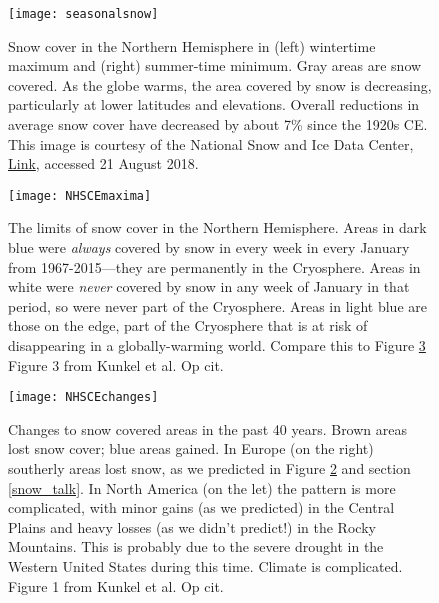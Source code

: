 \begin{figure}%
	\centering
  \texttt{[image: seasonalsnow]}%
	\caption{Snow cover in the Northern Hemisphere in (left) wintertime maximum and (right) summer-time minimum. Gray areas are snow covered. As the globe warms, the area covered by snow is decreasing, particularly at lower latitudes and elevations. Overall reductions in average snow cover have decreased by about 7\% since the 1920s CE. This image is courtesy of the National Snow and Ice Data Center,  \href{https://nsidc.org/cryosphere/snow/science/where.html}{Link}, accessed 21 August 2018.}
	\label{fig:seasonalsnow}
\end{figure}

\begin{figure}%
	\centering
  \texttt{[image: NHSCEmaxima]}%
	\caption{The limits of snow cover in the Northern Hemisphere. Areas in dark blue were \emph{always} covered by snow in every week in every January from 1967-2015---they are permanently in the Cryosphere. Areas in white were \emph{never} covered by snow in any week of January in that period, so were never part of the Cryosphere. Areas in light blue are those on the edge, part of the Cryosphere that is at risk of  disappearing in a globally-warming world. Compare this to Figure \ref{fig:sce} Figure 3 from Kunkel et al. Op cit.}
	\label{fig:scemax}
\end{figure}

\begin{figure}%
	\centering
  \texttt{[image: NHSCEchanges]}%
	\caption{Changes to snow covered areas in the past 40 years. Brown areas lost snow cover; blue areas gained. In Europe (on the right) southerly areas lost snow, as we predicted in Figure \ref{fig:scemax} and section \ref{snow_talk}. In North America (on the let) the pattern is more complicated, with minor gains (as we predicted) in the Central Plains and heavy losses (as we didn't predict!) in the Rocky Mountains. This is probably due to the severe drought in the Western United States during this time. Climate is complicated. Figure 1 from Kunkel et al. Op cit.}
	\label{fig:sce}
\end{figure}


